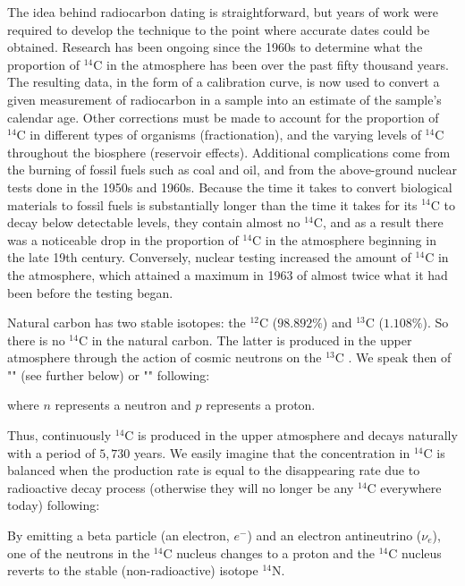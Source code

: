 	The idea behind radiocarbon dating is straightforward, but years of work were required to develop the technique to the point where accurate dates could be obtained. Research has been ongoing since the 1960s to determine what the proportion of $^{14}\mathrm{C}$ in the atmosphere has been over the past fifty thousand years. The resulting data, in the form of a calibration curve, is now used to convert a given measurement of radiocarbon in a sample into an estimate of the sample's calendar age. Other corrections must be made to account for the proportion of $^{14}\mathrm{C}$ in different types of organisms (fractionation), and the varying levels of $^{14}\mathrm{C}$ throughout the biosphere (reservoir effects). Additional complications come from the burning of fossil fuels such as coal and oil, and from the above-ground nuclear tests done in the 1950s and 1960s. Because the time it takes to convert biological materials to fossil fuels is substantially longer than the time it takes for its $^{14}\mathrm{C}$ to decay below detectable levels, they contain almost no $^{14}\mathrm{C}$, and as a result there was a noticeable drop in the proportion of $^{14}\mathrm{C}$ in the atmosphere beginning in the late 19th century. Conversely, nuclear testing increased the amount of $^{14}\mathrm{C}$ in the atmosphere, which attained a maximum in 1963 of almost twice what it had been before the testing began.
	
	Natural carbon has two stable isotopes: the $^{12}\mathrm{C}$ ($98.892\%$) and $^{13}\mathrm{C}$ ($1.108\%$). So there is no $^{14}\mathrm{C}$ in the natural carbon. The latter is produced in the upper atmosphere through the action of cosmic neutrons on the $^{13}\mathrm{C}$ . We speak then of "" (see further below) or "" following:
	
	where $n$ represents a neutron and $p$ represents a proton. 
	
	Thus, continuously $^{14} \mathrm{C}$ is produced in the upper atmosphere and decays naturally with a period of $5,730$ years. We easily imagine that the concentration in $^{14}\mathrm{C}$ is balanced when the production rate is equal to the disappearing rate due to radioactive decay process (otherwise they will no longer be any $^{14}\mathrm{C}$ everywhere today) following:
	
	By emitting a beta particle (an electron, $e^{-}$) and an electron antineutrino ($\nu_e$), one of the neutrons in the $^{14}\mathrm{C}$ nucleus changes to a proton and the $^{14}\mathrm{C}$  nucleus reverts to the stable (non-radioactive) isotope $^{14}\mathrm{N}$.
	
